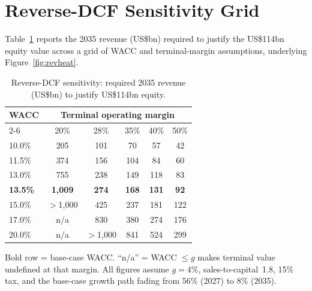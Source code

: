 \documentclass[11pt]{article}
\begin{document}


\clearpage
\section{Reverse-DCF Sensitivity Grid}
\label{sec:revheat}
Table~\ref{tab:revheat} reports the 2035 revenue (US\$bn) required to justify the US\$114bn equity value
across a grid of WACC and terminal-margin assumptions, underlying Figure~\ref{fig:revheat}.

\begin{table}[H]
\centering
\caption{Reverse-DCF sensitivity: required 2035 revenue (US\$bn) to justify US\$114bn equity.}
\label{tab:revheat}
\begin{tabular}{lccccc}
\toprule
WACC & \multicolumn{5}{c}{Terminal operating margin} \\
\cmidrule(lr){2-6}
 & 20\% & 28\% & 35\% & 40\% & 50\% \\
\midrule
10.0\% & 205 & 101 & 70 & 57 & 42 \\
11.5\% & 374 & 156 & 104 & 84 & 60 \\
13.0\% & 755 & 238 & 149 & 118 & 83 \\
\textbf{13.5\%} & \textbf{1{,}009} & \textbf{274} & \textbf{168} & \textbf{131} & \textbf{92} \\
15.0\% & $>$1{,}000 & 425 & 237 & 181 & 122 \\
17.0\% & n/a & 830 & 380 & 274 & 176 \\
20.0\% & n/a & $>$1{,}000 & 841 & 524 & 299 \\
\bottomrule
\end{tabular}

{\footnotesize Bold row = base-case WACC. ``n/a'' = WACC $\leq g$ makes terminal value undefined at that margin.
All figures assume $g=4\%$, sales-to-capital~1.8, 15\% tax, and the base-case growth path fading from
56\% (2027) to 8\% (2035).}
\end{table}
\end{document}
